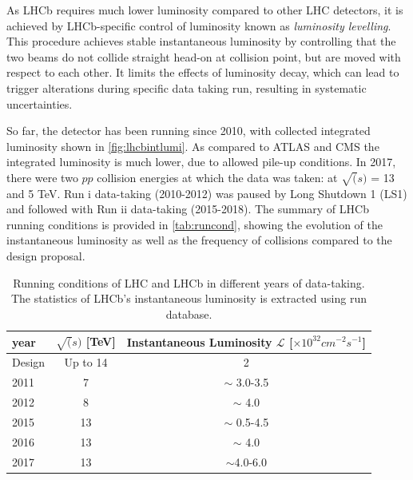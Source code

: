 As \Gls{LHCb} requires much lower luminosity compared to other LHC detectors, it is achieved by LHCb-specific control of luminosity known as \textit{luminosity levelling}. This procedure achieves stable instantaneous luminosity by controlling that the two beams do not collide straight head-on at collision point, but are moved with respect to each other. It limits the effects of luminosity decay, which can lead to trigger alterations during specific data taking run, resulting in systematic uncertainties.


So far, the detector has been running since 2010, with collected integrated luminosity shown in \autoref{fig:lhcbintlumi}. As compared to \Gls{ATLAS} and \Gls{CMS} the integrated luminosity is much lower, due to allowed pile-up conditions. In 2017, there were two $pp$ collision energies at which the data was taken: at $\sqrt(s)$  = 13 and 5 TeV. Run \Rn{1} data-taking (2010-2012) was paused by Long Shutdown 1 (\Gls{LS1}) and followed with Run \Rn{2} data-taking (2015-2018). The summary of LHCb running conditions is provided in \autoref{tab:runcond}, showing the evolution of the instantaneous luminosity as well as the frequency of collisions compared to the design proposal.




\begin{table}[!h]
	\centering
	\hspace*{-0.8cm}
	\begin{tabular}{l c c }
		\hline
		year & $\sqrt(s)$ [TeV] & Instantaneous Luminosity $\mathcal{L}$ [$\times10^{32} cm^{-2}	s^{-1}$] \\ \hline
		Design & Up to 14 & 2\\
		2011 & 7 & $\sim$ 3.0-3.5 \\
		2012 & 8 & $\sim$ 4.0 \\
		2015 & 13 & $\sim$ 0.5-4.5 \\      
		2016 & 13 & $\sim$ 4.0  \\      
		2017 & 13 & $\sim$4.0-6.0 \\\hline      
	\end{tabular}
	\caption{Running conditions of LHC and \Gls{LHCb} in different years of data-taking. The statistics of LHCb's instantaneous luminosity is extracted using run database. }
	\label{tab:runcond}
\end{table}   

